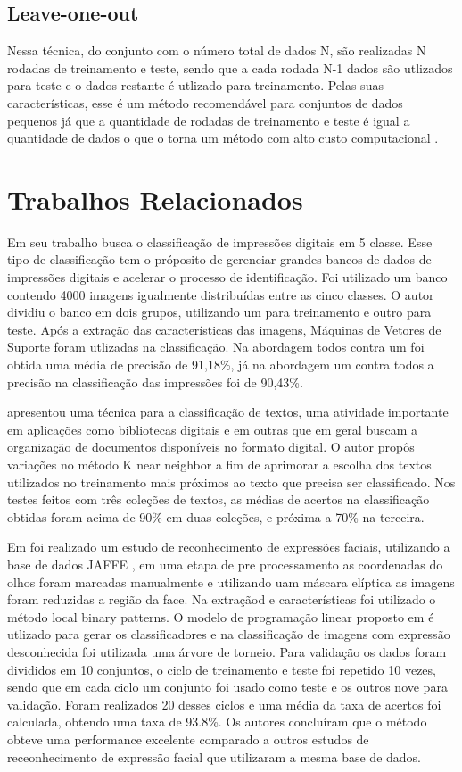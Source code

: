 \subsection{Leave-one-out}
Nessa técnica, do conjunto com o número total de dados N, são realizadas N rodadas de treinamento e teste, sendo que a cada rodada N-1 dados são utlizados para teste e o dados restante é utlizado para treinamento. Pelas suas características, esse é um método recomendável para conjuntos de dados pequenos já que a quantidade de rodadas de treinamento e teste é igual a quantidade de dados o que o torna um método com alto custo computacional \cite{Kohavi95Cross} \cite{Baldisserotto05Validacao}.

\section{Trabalhos Relacionados}
Em seu trabalho  busca o classificação de impressões digitais em 5 classe. Esse tipo de classificação tem o próposito de gerenciar grandes bancos de dados de impressões digitais e acelerar o processo de identificação. Foi utilizado um banco contendo 4000 imagens igualmente distribuídas entre as cinco classes. O autor dividiu o banco em dois grupos, utilizando um para treinamento e outro para teste. Após a extração das características das imagens, Máquinas de Vetores de Suporte foram utlizadas na classificação. Na abordagem todos contra um foi obtida uma média de precisão de 91,18\%, já na abordagem um contra todos a precisão na classificação das impressões foi de 90,43\%.

 apresentou uma técnica para a classificação de textos, uma atividade importante em aplicações como bibliotecas digitais e em outras que em geral buscam a organização de documentos disponíveis no formato digital. O autor propôs variações no método K near neighbor a fim de  aprimorar a escolha dos textos utilizados no treinamento mais próximos ao texto que precisa ser classificado. Nos testes feitos com três coleções de textos, as médias de acertos na classificação obtidas foram acima de 90\% em duas coleções, e próxima a 70\% na terceira.

Em  foi realizado um estudo de reconhecimento de expressões faciais, utilizando a base de dados JAFFE \cite{Jaffe}, em uma etapa de pre processamento as coordenadas do olhos foram marcadas manualmente e utilizando uam máscara elíptica as imagens foram reduzidas a região da face. Na extraçãod e características foi utilizado o método local binary patterns. O modelo de programação linear proposto em \cite{Bennett92robustlinear} é utlizado para gerar os classificadores e na classificação de imagens com expressão desconhecida foi utilizada uma árvore de torneio. Para validação os dados foram divididos em 10 conjuntos, o ciclo de treinamento e teste foi repetido 10 vezes, sendo que em cada ciclo um conjunto foi usado como teste e os outros nove para validação. Foram realizados 20 desses ciclos e uma média da taxa de acertos foi calculada, obtendo uma taxa de 93.8\%. Os autores concluíram que o método obteve uma performance excelente comparado a outros estudos de receonhecimento de expressão facial que utilizaram a mesma base de dados.
